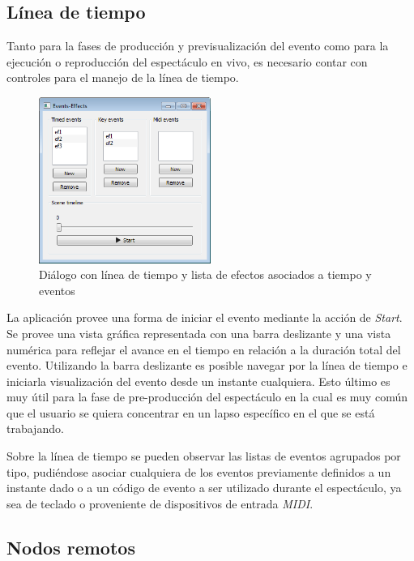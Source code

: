 \subsection{Línea de tiempo}

Tanto para la fases de producción y previsualización del evento como para la ejecución o reproducción del espectáculo en vivo, es necesario contar con controles para el manejo de la línea de tiempo.

\begin{figure}[H]
  \centering
    \includegraphics[width=0.5\textwidth]{./Cap5_vmt/vmt_events_effects.png}
  \caption{Diálogo con línea de tiempo y lista de efectos asociados a tiempo y eventos}
  \label{fig:VMT-Timeline}
\end{figure}

La aplicación provee una forma de iniciar el evento mediante la acción de \emph{Start}. Se provee una vista gráfica representada con una barra deslizante y una vista numérica para reflejar el avance en el tiempo en relación a la duración total del evento. Utilizando la barra deslizante es posible navegar por la línea de tiempo e iniciarla visualización del evento desde un instante cualquiera. Esto último es muy útil para la fase de pre-producción del espectáculo en la cual es muy común que el usuario se quiera concentrar en un lapso específico en el que se está trabajando.

Sobre la línea de tiempo se pueden observar las listas de eventos agrupados por tipo, pudiéndose asociar cualquiera de los eventos previamente definidos a un instante dado o a un código de evento a ser utilizado durante el espectáculo, ya sea de teclado o proveniente de dispositivos de entrada \emph{MIDI}.

\subsection{Nodos remotos}

